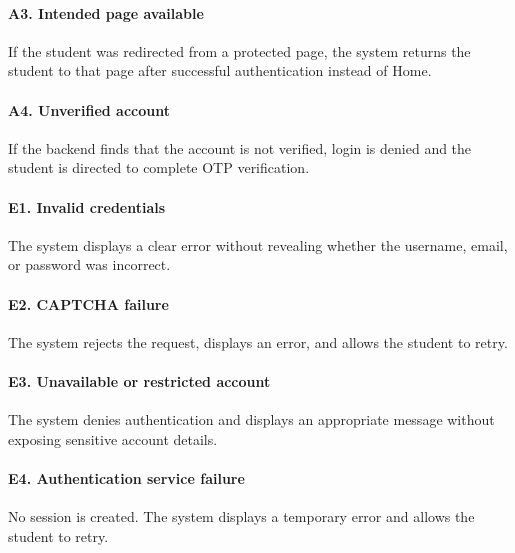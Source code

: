 \documentclass[12pt]{article}
\begin{document}
\paragraph*{A3. Intended page available}
\par\medskip
If the student was redirected from a protected page, the system returns the student to that page after successful authentication instead of Home.
\par\medskip
\hypertarget{sec:a4-unverified-account}{}
\paragraph*{A4. Unverified account}
\par\medskip
If the backend finds that the account is not verified, login is denied and the student is directed to complete OTP verification.
\par\medskip
\hypertarget{sec:e1-invalid-credentials}{}
\paragraph*{E1. Invalid credentials}
\par\medskip
The system displays a clear error without revealing whether the username, email, or password was incorrect.
\par\medskip
\hypertarget{sec:e2-captcha-failure}{}
\paragraph*{E2. CAPTCHA failure}
\par\medskip
The system rejects the request, displays an error, and allows the student to retry.
\par\medskip
\hypertarget{sec:e3-unavailable-or-restricted-account}{}
\paragraph*{E3. Unavailable or restricted account}
\par\medskip
The system denies authentication and displays an appropriate message without exposing sensitive account details.
\par\medskip
\hypertarget{sec:e4-authentication-service-failure}{}
\paragraph*{E4. Authentication service failure}
\par\medskip
No session is created. The system displays a temporary error and allows the student to retry.
\par\medskip
\hypertarget{sec:e5-session-expires-while-accessing-a-protected-page}{}
\end{document}
